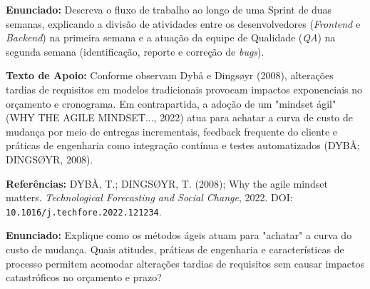 \documentclass[12pt]{article}
\begin{document}
\vspace{0.15cm}
\noindent\textbf{Enunciado:} Descreva o fluxo de trabalho ao longo de uma Sprint de duas semanas, explicando a divisão de atividades entre os desenvolvedores (\textit{Frontend} e \textit{Backend}) na primeira semana e a atuação da equipe de Qualidade (\textit{QA}) na segunda semana (identificação, reporte e correção de \textit{bugs}).

\vspace{0.2cm}
\begin{caixaResposta}
\end{caixaResposta}

\vspace{0.6cm}

\vspace{0.15cm}

\begin{textoApoio}
\small
\textbf{Texto de Apoio:} Conforme observam Dybå e Dingsøyr (2008), alterações tardias de requisitos em modelos tradicionais provocam impactos exponenciais no orçamento e cronograma. Em contrapartida, a adoção de um "mindset ágil" (WHY THE AGILE MINDSET..., 2022) atua para achatar a curva de custo de mudança por meio de entregas incrementais, feedback frequente do cliente e práticas de engenharia como integração contínua e testes automatizados (DYBÅ; DINGSØYR, 2008).

\vspace{0.15cm}
\noindent\textbf{Referências:} DYBÅ, T.; DINGSØYR, T. (2008); Why the agile mindset matters. \textit{Technological Forecasting and Social Change}, 2022. DOI: \texttt{10.1016/j.techfore.2022.121234}.
\end{textoApoio}

\vspace{0.15cm}
\noindent\textbf{Enunciado:} Explique como os métodos ágeis atuam para "achatar" a curva do custo de mudança. Quais atitudes, práticas de engenharia e características de processo permitem acomodar alterações tardias de requisitos sem causar impactos catastróficos no orçamento e prazo?

\vspace{0.2cm}
\begin{caixaResposta}
\end{caixaResposta}

\vspace{0.6cm}
\end{document}
